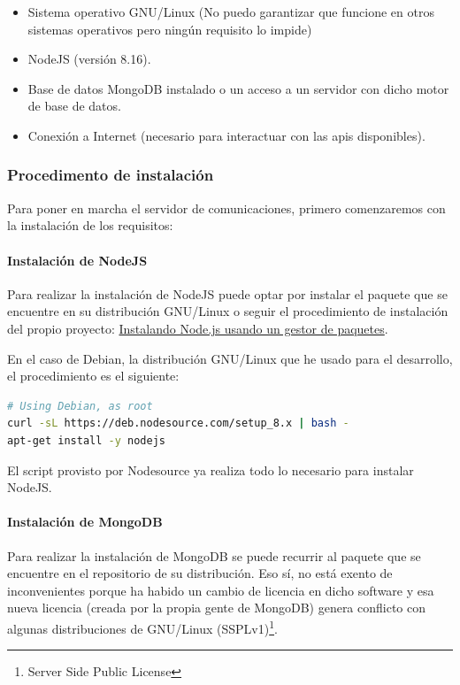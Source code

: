 \documentclass[spanish,12pt, a4paper, twoside]{paper}
\begin{document}
\begin{itemize}
\item Sistema operativo GNU/Linux (No puedo garantizar que funcione en otros sistemas operativos pero ningún requisito lo impide)
\item NodeJS (versión 8.16).
\item Base de datos MongoDB instalado o un acceso a un servidor con dicho motor de base de datos.
\item Conexión a Internet (necesario para interactuar con las apis disponibles).
\end{itemize}

\subsubsection{Procedimento de instalación}

Para poner en marcha el servidor de comunicaciones, primero comenzaremos con la instalación de los requisitos:

\paragraph{Instalación de NodeJS}

Para realizar la instalación de NodeJS puede optar por instalar el paquete que se encuentre en su distribución GNU/Linux o seguir el procedimiento de instalación del propio proyecto: \href{https://nodejs.org/es/download/package-manager/}{Instalando Node.js usando un gestor de paquetes}.
\newline

En el caso de Debian, la distribución GNU/Linux que he usado para el desarrollo, el procedimiento es el siguiente:

\begin{lstlisting}[language=sh]
# Using Debian, as root
curl -sL https://deb.nodesource.com/setup_8.x | bash -
apt-get install -y nodejs
\end{lstlisting}

El script provisto por Nodesource ya realiza todo lo necesario para instalar NodeJS.

\paragraph{Instalación de MongoDB} Para realizar la instalación de MongoDB se puede recurrir al paquete que se encuentre en el repositorio de su distribución. Eso sí, no está exento de inconvenientes porque ha habido un cambio de licencia en dicho software y esa nueva licencia (creada por la propia gente de MongoDB) genera conflicto con algunas distribuciones de GNU/Linux (SSPLv1)\footnote{Server Side Public License}.
\end{document}
